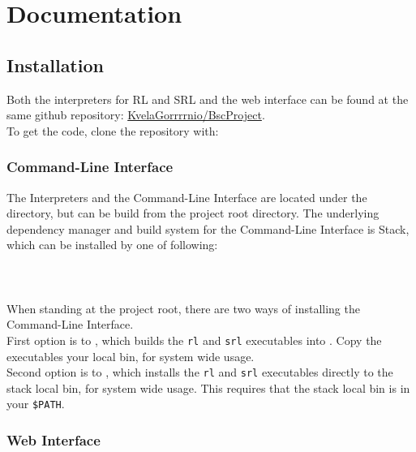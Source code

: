 \chapter*{Documentation}
%

\section*{Installation}
%

Both the interpreters for RL and SRL and the web interface can be found at the same github repository: \href{https://github.com/KvelaGorrrrnio/BscProject}{KvelaGorrrrnio/BscProject}.\\
To get the code, clone the repository with:

\subsection*{Command-Line Interface}
%
The Interpreters and the Command-Line Interface are located under the  directory, but can be build from the project root directory.
The underlying dependency manager and build system for the Command-Line Interface is Stack, which can be installed by one of following:\\
\\
\\
\\

\noindent
When standing at the project root, there are two ways of installing the Command-Line Interface.\\
First option is to , which builds the \texttt{rl} and \texttt{srl} executables into . Copy the executables your local bin, for system wide usage.\\
Second option is to , which installs the \texttt{rl} and \texttt{srl} executables directly to the stack local bin, for system wide usage. This requires that the stack local bin is in your \texttt{\$PATH}.

\subsection*{Web Interface}
%

